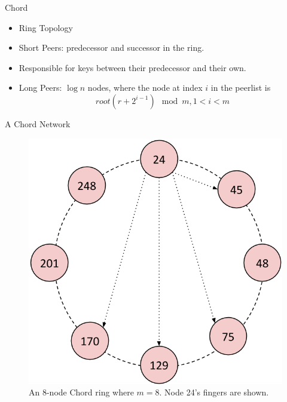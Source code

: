 \documentclass[11pt]{beamer}
\begin{document}
\begin{frame}{Chord}
	\begin{itemize}
		\item Ring Topology
		\item Short Peers: predecessor and successor in the ring.
		\item Responsible for keys between their predecessor and their own.
		\item Long Peers:  $\log n$ nodes, where the node at index $i$ in the  peerlist is 
		$$ root(r + 2^{i-1}) \mod  m,  1 < i  < m $$
		
		
		
	\end{itemize}
\end{frame}


\begin{frame}{A Chord Network}
	\begin{figure}
		\includegraphics[width=0.55\linewidth]{figs/CR_overlay}
		\caption{An 8-node Chord ring where $m=8$.  Node 24's fingers are shown.}
		\label{fig:chordreal}
	\end{figure}
\end{frame}
\end{document}
